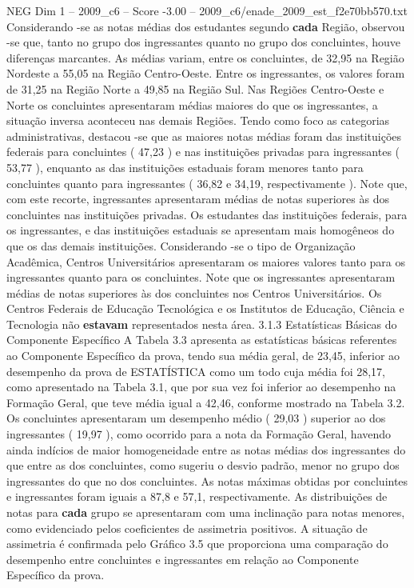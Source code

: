 \begin{textsample}{NEG Dim 1 – 2009\_c6 – Score -3.00 – 2009\_c6/enade\_2009\_est\_f2e70bb570.txt}
Considerando -se as notas médias dos estudantes segundo \textbf{cada} Região, observou -se que, tanto no grupo dos ingressantes quanto no grupo dos concluintes, houve diferenças marcantes.
As médias variam, entre os concluintes, de 32,95 na Região Nordeste a 55,05 na Região Centro-Oeste.
Entre os ingressantes, os valores foram de 31,25 na Região Norte a 49,85 na Região Sul.
Nas Regiões Centro-Oeste e Norte os concluintes apresentaram médias maiores do que os ingressantes, a situação inversa aconteceu nas demais Regiões.
Tendo como foco as categorias administrativas, destacou -se que as maiores notas médias foram das instituições federais para concluintes ( 47,23 ) e nas instituições privadas para ingressantes ( 53,77 ), enquanto as das instituições estaduais foram menores tanto para concluintes quanto para ingressantes ( 36,82 e 34,19, respectivamente ).
Note que, com este recorte, ingressantes apresentaram médias de notas superiores às dos concluintes nas instituições privadas.
Os estudantes das instituições federais, para os ingressantes, e das instituições estaduais se apresentam mais homogêneos do que os das demais instituições.
Considerando -se o tipo de Organização Acadêmica, Centros Universitários apresentaram os maiores valores tanto para os ingressantes quanto para os concluintes.
Note que os ingressantes apresentaram médias de notas superiores às dos concluintes nos Centros Universitários.
Os Centros Federais de Educação Tecnológica e os Institutos de Educação, Ciência e Tecnologia não \textbf{estavam} representados nesta área. 3.1.3 Estatísticas Básicas do Componente Específico A Tabela 3.3 apresenta as estatísticas básicas referentes ao Componente Específico da prova, tendo sua média geral, de 23,45, inferior ao desempenho da prova de ESTATÍSTICA como um todo cuja média foi 28,17, como apresentado na Tabela 3.1, que por sua vez foi inferior ao desempenho na Formação Geral, que teve média igual a 42,46, conforme mostrado na Tabela 3.2.
Os concluintes apresentaram um desempenho médio ( 29,03 ) superior ao dos ingressantes ( 19,97 ), como ocorrido para a nota da Formação Geral, havendo ainda indícios de maior homogeneidade entre as notas médias dos ingressantes do que entre as dos concluintes, como sugeriu o desvio padrão, menor no grupo dos ingressantes do que no dos concluintes.
As notas máximas obtidas por concluintes e ingressantes foram iguais a 87,8 e 57,1, respectivamente.
As distribuições de notas para \textbf{cada} grupo se apresentaram com uma inclinação para notas menores, como evidenciado pelos coeficientes de assimetria positivos.
A situação de assimetria é confirmada pelo Gráfico 3.5 que proporciona uma comparação do desempenho entre concluintes e ingressantes em relação ao Componente Específico da prova.

\end{textsample}
